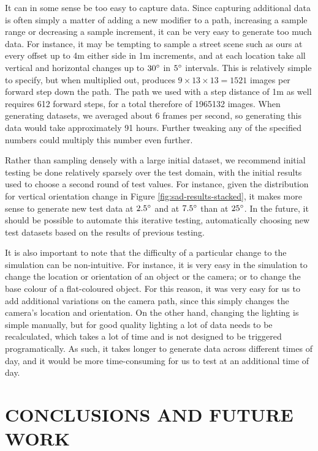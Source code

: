\documentclass[letterpaper, 10 pt, conference]{ieeeconf}  %
\begin{document}
It can in some sense be too easy to capture data. Since capturing additional data is often simply a matter of adding a new modifier to a path, increasing a sample range or decreasing a sample increment, it can be very easy to generate too much data. For instance, it may be tempting to sample a street scene such as ours at every offset up to 4m either side in 1m increments, and at each location take all vertical and horizontal changes up to $30\degree$ in $5\degree$ intervals. This is relatively simple to specify, but when multiplied out, produces $9 \times 13 \times 13 = 1521$ images per forward step down the path. The path we used with a step distance of 1m as well requires 612 forward steps, for a total therefore of 1965132 images. When generating datasets, we averaged about 6 frames per second, so generating this data would take approximately 91 hours. Further tweaking any of the specified numbers could multiply this number even further.

Rather than sampling densely with a large initial dataset, we recommend initial testing be done relatively sparsely over the test domain, with the initial results used to choose a second round of test values. For instance, given the distribution for vertical orientation change in Figure \ref{fig:sad-results-stacked}, it makes more sense to generate new test data at $2.5\degree$ and at $7.5\degree$ than at $25\degree$. In the future, it should be possible to automate this iterative testing, automatically choosing new test datasets based on the results of previous testing.

It is also important to note that the difficulty of a particular change to the simulation can be non-intuitive. For instance, it is very easy in the simulation to change the location or orientation of an object or the camera; or to change the base colour of a flat-coloured object. For this reason, it was very easy for us to add additional variations on the camera path, since this simply changes the camera's location and orientation. On the other hand, changing the lighting is simple manually, but for good quality lighting a lot of data needs to be recalculated, which takes a lot of time and is not designed to be triggered programatically. As such, it takes longer to generate data across different times of day, and it would be more time-consuming for us to test at an additional time of day.

\section{CONCLUSIONS AND FUTURE WORK} \label{sec:conclusion}
\end{document}
